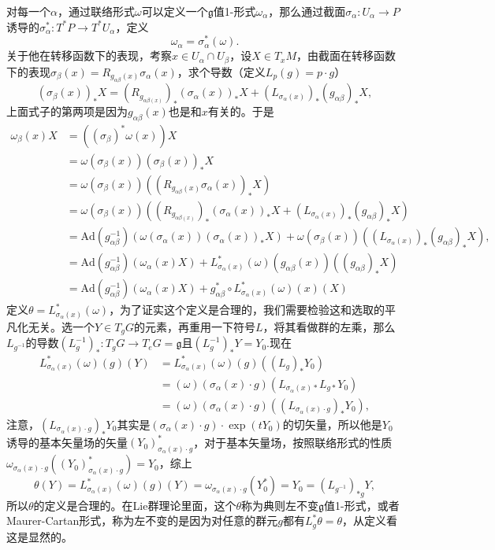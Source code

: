 对每一个$\alpha$，通过联络形式$\omega$可以定义一个$\mathfrak{g}$值1-形式$\omega_\alpha$，那么通过截面$\sigma_\alpha:U_\alpha\to P$诱导的$\sigma_\alpha^*:T^*P\to T^*U_\alpha$，定义
\[
	\omega_\alpha=\sigma_\alpha^*(\omega).
\]
关于他在转移函数下的表现，考察$x\in U_\alpha\cap U_\beta$，设$X\in T_x M$，由截面在转移函数下的表现$\sigma_\beta(x)=R_{g_{\alpha\beta}(x)}\sigma_\alpha(x)$，求个导数（定义$L_p(g)=p\cdot g$）
\[
	(\sigma_\beta(x))_*X=(R_{g_{\alpha\beta(x)}})_*(\sigma_\alpha(x))_*X+\left(L_{\sigma_\alpha(x)}\right)_*(g_{\alpha\beta})_*X,
\]
上面式子的第两项是因为$g_{\alpha\beta}(x)$也是和$x$有关的。于是
\begin{align*}
	\omega_\beta(x)X&=((\sigma_\beta)^*\omega(x))X\\
	&=\omega(\sigma_\beta(x))(\sigma_\beta(x))_*X\\
	&=\omega(\sigma_\beta(x))((R_{g_{\alpha\beta}(x)}\sigma_\alpha(x))_*X)\\
	&=\omega(\sigma_\beta(x))\left((R_{g_{\alpha\beta(x)}})_*(\sigma_\alpha(x))_*X+\left(L_{\sigma_\alpha(x)}\right)_*(g_{\alpha\beta})_*X\right)\\
	&=\mathrm{Ad}(g_{\alpha\beta}^{-1})\left(\omega(\sigma_\alpha(x))(\sigma_\alpha(x))_*X\right)+\omega(\sigma_\beta(x))\left(\left(L_{\sigma_\alpha(x)}\right)_*(g_{\alpha\beta})_*X\right),\\
	&=\mathrm{Ad}(g_{\alpha\beta}^{-1})\left(\omega_\alpha(x)X\right)+L_{\sigma_\alpha(x)}^*(\omega)(g_{\alpha\beta}(x))\left((g_{\alpha\beta})_*X\right)\\
	&=\mathrm{Ad}(g_{\alpha\beta}^{-1})\left(\omega_\alpha(x)X\right)+g_{\alpha\beta}^*\circ L_{\sigma_\alpha(x)}^*(\omega)(x)\left(X\right)
\end{align*}
定义$\theta=L_{\sigma_\alpha(x)}^*(\omega)$，为了证实这个定义是合理的，我们需要检验这和选取的平凡化无关。选一个$Y\in T_g G$的元素，再重用一下符号$L$，将其看做群的左乘，那么$L_{g^{-1}}$的导数$(L_g^{-1})_* :T_g G\to T_e G=\mathfrak{g}$且$(L_g^{-1})_*Y=Y_0$.现在
\begin{align*}
	L_{\sigma_\alpha(x)}^*(\omega)(g)(Y)&=L_{\sigma_\alpha(x)}^*(\omega)(g)((L_g)_*Y_0)\\
	&=(\omega)(\sigma_\alpha(x)\cdot g)\left(L_{\sigma_\alpha(x)*}L_{g*}Y_0\right)\\
	&=(\omega)(\sigma_\alpha(x)\cdot g)\left(\left(L_{\sigma_\alpha(x)\cdot g}\right)_*Y_0\right),
\end{align*}
注意，$\left(L_{\sigma_\alpha(x)\cdot g}\right)_*Y_0$其实是$(\sigma_\alpha(x)\cdot g)\cdot \exp{(tY_0)}$的切矢量，所以他是$Y_0$诱导的基本矢量场的矢量$(Y_0)^*_{\sigma_\alpha(x)\cdot g}$，对于基本矢量场，按照联络形式的性质$\omega_{\sigma_\alpha(x)\cdot g}\left((Y_0)^*_{\sigma_\alpha(x)\cdot g}\right)=Y_0$，综上
\[
	\theta(Y)=L_{\sigma_\alpha(x)}^*(\omega)(g)(Y)=\omega_{\sigma_\alpha(x)\cdot g}(Y_0^*)=Y_0=\left(L_{g^{-1}}\right)_{*g}Y,
\]
所以$\theta$的定义是合理的。在Lie群理论里面，这个$\theta$称为典则左不变$\mathfrak{g}$值1-形式，或者Maurer-Cartan形式，称为左不变的是因为对任意的群元$g$都有$L_g^{*}\theta=\theta$，从定义看这是显然的。

